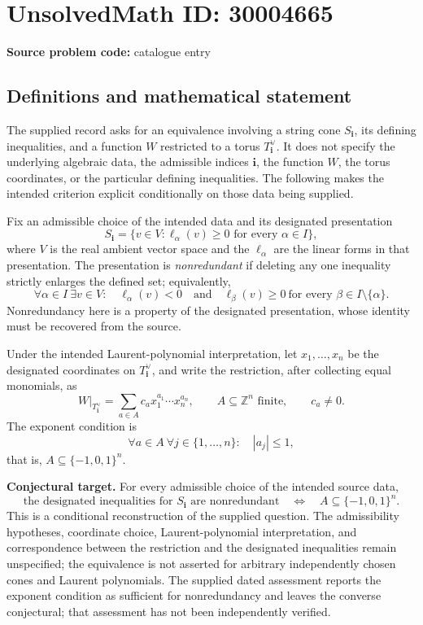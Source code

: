 \documentclass[11pt]{article}
\begin{document}
\section*{UnsolvedMath ID: 30004665}
\textbf{Source problem code:} catalogue entry
\subsection{Definitions and mathematical statement}
The supplied record asks for an equivalence involving a string cone \(S_{\mathbf i}\), its defining inequalities, and a function \(W\) restricted to a torus \(T_{\mathbf i}^{\vee}\). It does not specify the underlying algebraic data, the admissible indices \(\mathbf i\), the function \(W\), the torus coordinates, or the particular defining inequalities. The following makes the intended criterion explicit conditionally on those data being supplied.

Fix an admissible choice of the intended data and its designated presentation
\[
S_{\mathbf i}=\{v\in V:\ell_{\alpha}(v)\geq 0\text{ for every }\alpha\in I\},
\]
where \(V\) is the real ambient vector space and the \(\ell_{\alpha}\) are the linear forms in that presentation. The presentation is \emph{nonredundant} if deleting any one inequality strictly enlarges the defined set; equivalently,
\[
\forall\alpha\in I\ \exists v\in V:\quad
\ell_{\alpha}(v)<0
\quad\text{and}\quad
\ell_{\beta}(v)\geq0\ \text{for every }\beta\in I\setminus\{\alpha\}.
\]
Nonredundancy here is a property of the designated presentation, whose identity must be recovered from the source.

Under the intended Laurent-polynomial interpretation, let \(x_1,\ldots,x_n\) be the designated coordinates on \(T_{\mathbf i}^{\vee}\), and write the restriction, after collecting equal monomials, as
\[
\left.W\right|_{T_{\mathbf i}^{\vee}}
 =\sum_{a\in A}c_a x_1^{a_1}\cdots x_n^{a_n},
\qquad A\subseteq\mathbb Z^n\text{ finite},\qquad c_a\neq0.
\]
The exponent condition is
\[
\forall a\in A\ \forall j\in\{1,\ldots,n\}:\quad |a_j|\leq1,
\]
that is, \(A\subseteq\{-1,0,1\}^n\).

\textbf{Conjectural target.} For every admissible choice of the intended source data,
\[
\text{the designated inequalities for }S_{\mathbf i}\text{ are nonredundant}
\quad\Longleftrightarrow\quad
A\subseteq\{-1,0,1\}^n.
\]
This is a conditional reconstruction of the supplied question. The admissibility hypotheses, coordinate choice, Laurent-polynomial interpretation, and correspondence between the restriction and the designated inequalities remain unspecified; the equivalence is not asserted for arbitrary independently chosen cones and Laurent polynomials. The supplied dated assessment reports the exponent condition as sufficient for nonredundancy and leaves the converse conjectural; that assessment has not been independently verified.
\end{document}
